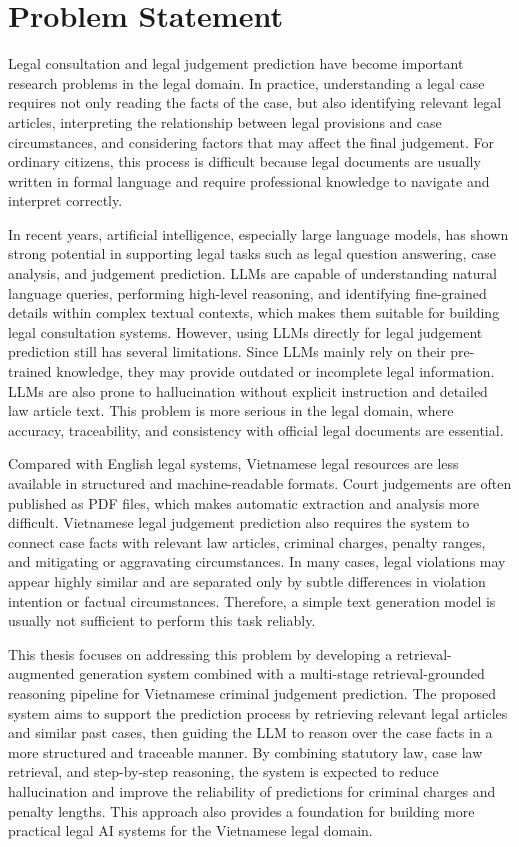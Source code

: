 \documentclass[../main.tex]{subfiles}
\begin{document}
\section{Problem Statement}
\label{sec:dvd}
Legal consultation and legal judgement prediction have become important research problems in the legal domain. In practice, understanding a legal case requires not only reading the facts of the case, but also identifying relevant legal articles, interpreting the relationship between legal provisions and case circumstances, and considering factors that may affect the final judgement. For ordinary citizens, this process is difficult because legal documents are usually written in formal language and require professional knowledge to navigate and interpret correctly. 

In recent years, artificial intelligence, especially large language models, has shown strong potential in supporting legal tasks such as legal question answering, case analysis, and judgement prediction. LLMs are capable of understanding natural language queries, performing high-level reasoning, and identifying fine-grained details within complex textual contexts, which makes them suitable for building legal consultation systems. However, using LLMs directly for legal judgement prediction still has several limitations. Since LLMs mainly rely on their pre-trained knowledge, they may provide outdated or incomplete legal information. LLMs are also prone to hallucination without explicit instruction and detailed law article text. This problem is more serious in the legal domain, where accuracy, traceability, and consistency with official legal documents are essential.

Compared with English legal systems, Vietnamese legal resources are less available in structured and machine-readable formats. Court judgements are often published as PDF files, which makes automatic extraction and analysis more difficult. Vietnamese legal judgement prediction also requires the system to connect case facts with relevant law articles, criminal charges, penalty ranges, and mitigating or aggravating circumstances. In many cases, legal violations may appear highly similar and are separated only by subtle differences in violation intention or factual circumstances. Therefore, a simple text generation model is usually not sufficient to perform this task reliably.

This thesis focuses on addressing this problem by developing a retrieval-augmented generation system combined with a multi-stage retrieval-grounded reasoning pipeline for Vietnamese criminal judgement prediction. The proposed system aims to support the prediction process by retrieving relevant legal articles and similar past cases, then guiding the LLM to reason over the case facts in a more structured and traceable manner. By combining statutory law, case law retrieval, and step-by-step reasoning, the system is expected to reduce hallucination and improve the reliability of predictions for criminal charges and penalty lengths. This approach also provides a foundation for building more practical legal AI systems for the Vietnamese legal domain.
\end{document}
